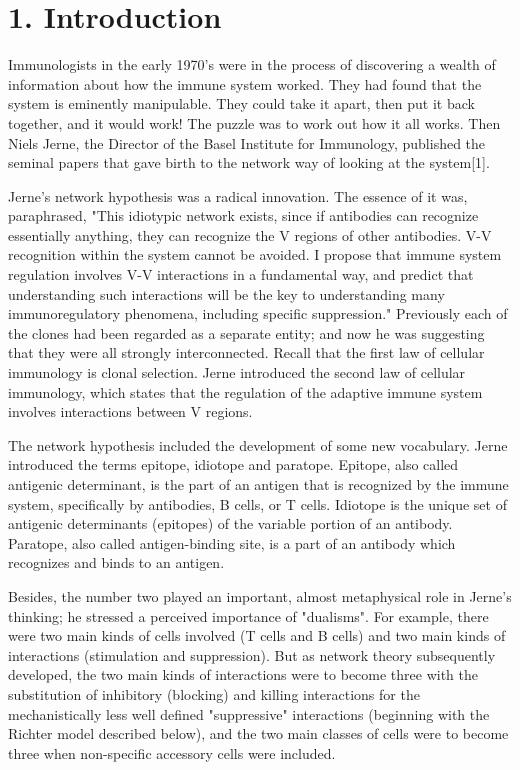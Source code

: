 \documentclass[Proceedings]{ascelike}
\begin{document}
\section{1. Introduction}
Immunologists in the early 1970's were in the process of discovering a wealth of information about how the immune system worked. They had found that the system is eminently manipulable. They could take it apart, then put it back together, and it would work! The puzzle was to work out how it all works. Then Niels Jerne, the Director of the Basel Institute for Immunology, published the seminal papers that gave birth to the network way of looking at the system[1].
\par
Jerne's network hypothesis was a radical innovation. The essence of it was, paraphrased, "This idiotypic network exists, since if antibodies can recognize essentially anything, they can recognize the V regions of other antibodies. V-V recognition within the system cannot be avoided. I propose that immune system regulation involves V-V interactions in a fundamental way, and predict that understanding such interactions will be the key to understanding many immunoregulatory phenomena, including specific suppression." Previously each of the clones had been regarded as a separate entity; and now he was suggesting that they were all strongly interconnected. Recall that the first law of cellular immunology is clonal selection. Jerne introduced the second law of cellular immunology, which states that the regulation of the adaptive immune system involves interactions between V regions.
\par
The network hypothesis included the development of some new vocabulary. Jerne introduced the terms epitope, idiotope and paratope. Epitope, also called antigenic determinant, is the part of an antigen that is recognized by the immune system, specifically by antibodies, B cells, or T cells. Idiotope is the unique set of antigenic determinants (epitopes) of the variable portion of an antibody. Paratope, also called antigen-binding site, is a part of an antibody which recognizes and binds to an antigen. 
\par
Besides, the number two played an important, almost metaphysical role in Jerne's thinking; he stressed a perceived importance of "dualisms". For example, there were two main kinds of cells involved (T cells and B cells) and two main kinds of interactions (stimulation and suppression). But as network theory subsequently developed, the two main kinds of interactions were to become three with the substitution of inhibitory (blocking) and killing interactions for the mechanistically less well defined "suppressive" interactions (beginning with the Richter model described below), and the two main classes of cells were to become three when non-specific accessory cells were included.
\end{document}
